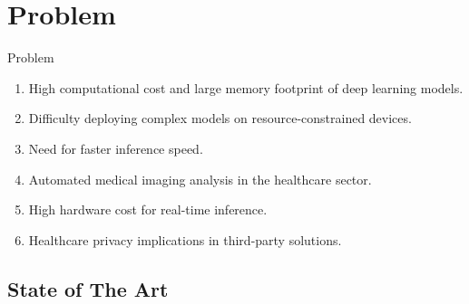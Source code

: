\documentclass[aspectratio=169,xcolor=dvipsnames]{beamer}
\begin{document}
\section{Problem}

\begin{frame}{Problem}
    \begin{multicols}{2}
        \begin{enumerate}
            \item High computational cost and large memory footprint of deep learning models.
            \item Difficulty deploying complex models on resource-constrained devices.
            \item Need for faster inference speed.
            \item Automated medical imaging analysis in the healthcare sector. %
            \item High hardware cost for real-time inference.
            \item Healthcare privacy implications in third-party solutions. %
        \end{enumerate}
    \end{multicols}
\end{frame}



\subsection{State of The Art}

\end{document}
